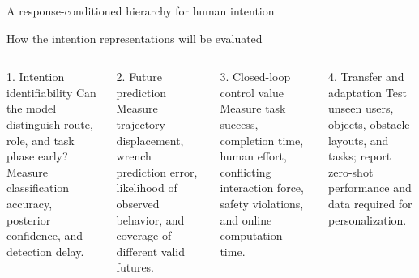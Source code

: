 \documentclass[aspectratio=169,11pt]{beamer}
\begin{document}
\begin{frame}{A response-conditioned hierarchy for human intention}
\end{frame}

\begin{frame}{How the intention representations will be evaluated}
\begin{columns}[T,onlytextwidth]
\begin{block}{1. Intention identifiability}
Can the model distinguish route, role, and task phase early? Measure classification accuracy, posterior confidence, and detection delay.
\end{block}
\begin{block}{2. Future prediction}
Measure trajectory displacement, wrench prediction error, likelihood of observed behavior, and coverage of different valid futures.
\end{block}
\begin{block}{3. Closed-loop control value}
Measure task success, completion time, human effort, conflicting interaction force, safety violations, and online computation time.
\end{block}
\begin{block}{4. Transfer and adaptation}
Test unseen users, objects, obstacle layouts, and tasks; report zero-shot performance and data required for personalization.
\end{block}
\end{columns}
\end{frame}
\end{document}
